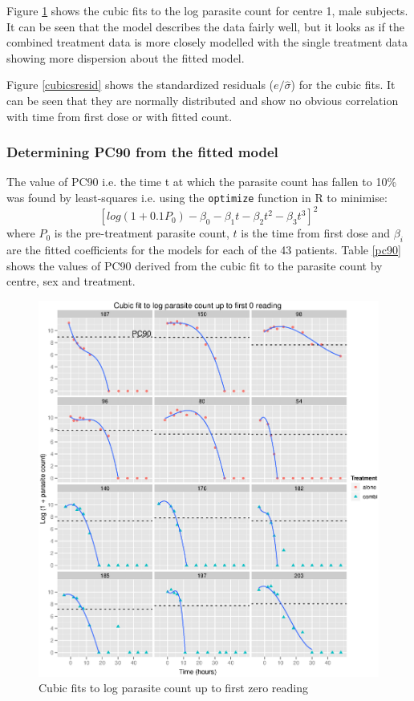 Figure \ref{cubics} shows the cubic fits to the log parasite count for centre 1, male subjects. It can be seen that the model describes the data fairly well, but it looks as if the combined treatment data is more closely modelled with the single treatment data showing more dispersion about the fitted model. 

Figure \ref{cubicsresid} shows the standardized residuals ($e/\hat{\sigma}$) for the cubic fits. It can be seen that they are normally distributed and show no obvious correlation with time from first dose or with fitted count.
\subsubsection*{Determining PC90 from the fitted model}
The value of PC90 i.e. the time t at which the parasite count has fallen to 10\% was found by least-squares i.e. using the \texttt{optimize} function in R to minimise:
$$[log(1+0.1P_0)-\beta_0-\beta_1t-\beta_2t^2-\beta_3t^3]^2$$
where $P_0$ is the pre-treatment parasite count, $t$ is the time from first dose and $\beta_i$ are the fitted coefficients for the models for each of the 43 patients. Table \ref{pc90} shows the values of PC90 derived from the cubic fit to the parasite count by centre, sex and treatment.
\begin{figure}[h]
\includegraphics[width=6.1in]{cubics.eps} 
\caption{Cubic fits to log parasite count up to first zero reading}\label{cubics}
\end{figure}
